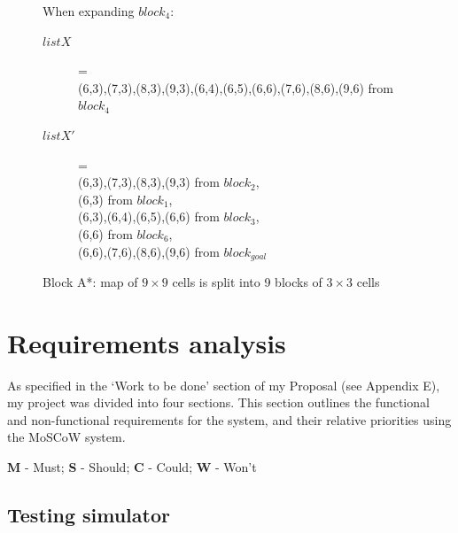 \documentclass[12pt,notitlepage]{report}
\begin{document}
\begin{figure}[h]
\begin{center}
  \end{center}
 
\noindent 
When expanding $block_{4}$:
\begin{description}
\item[$listX$] = \\ \hfill (6,3),(7,3),(8,3),(9,3),(6,4),(6,5),(6,6),(7,6),(8,6),(9,6) from $block_{4}$\\
\item[$listX'$] = \\ \hfill (6,3),(7,3),(8,3),(9,3) from $block_{2}$,\\ (6,3) from $block_{1}$,\\ (6,3),(6,4),(6,5),(6,6) from $block_{3}$,\\ (6,6) from $block_{6}$,\\ (6,6),(7,6),(8,6),(9,6) from $block_{goal}$
\end{description}

  \caption{Block A*: map of {$ 9 \times 9$} cells is split into 9 blocks of {$ 3 \times 3$} cells} 
  \label{fig:lineofsight}
\end{figure}


\clearpage
\section {Requirements analysis}

As specified in the `Work to be done' section of my Proposal (see Appendix E), my project was divided into four sections. This section outlines the functional and non-functional requirements for the system, and their relative priorities using the MoSCoW system. \\
\centerline {{\bf M} - Must; {\bf S} - Should; {\bf C} - Could; {\bf W} - Won't}

\subsection{Testing simulator}
\end{document}
